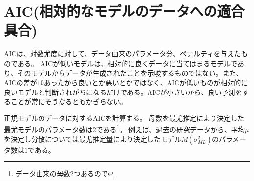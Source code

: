 \section{AIC(相対的なモデルのデータへの適合具合)}
AICは、対数尤度に対して、データ由来のパラメータ分、ペナルティを与えたものである。
AICが低いモデルは、相対的に良くデータに当てはまるモデルであり、そのモデルからデータが生成されたことを示唆するものではない。また、AICの差が$10$あったから良いとか悪いとかではなく、AICが低いものが相対的に良いモデルと判断されがちになるだけである。AICが小さいから、良い予測をすることが常にそうなるともかぎらない。

正規モデルのデータに対するAICを計算する。
母数を最尤推定により決定した最尤モデルのパラメータ数は2である\footnote{データ由来の母数2つあるので}。
例えば、過去の研究データから、平均$\mu$を決定し分散については最尤推定量により決定したモデル$M(\sigma^2_{ML})$のパラメータ数は$1$である。






